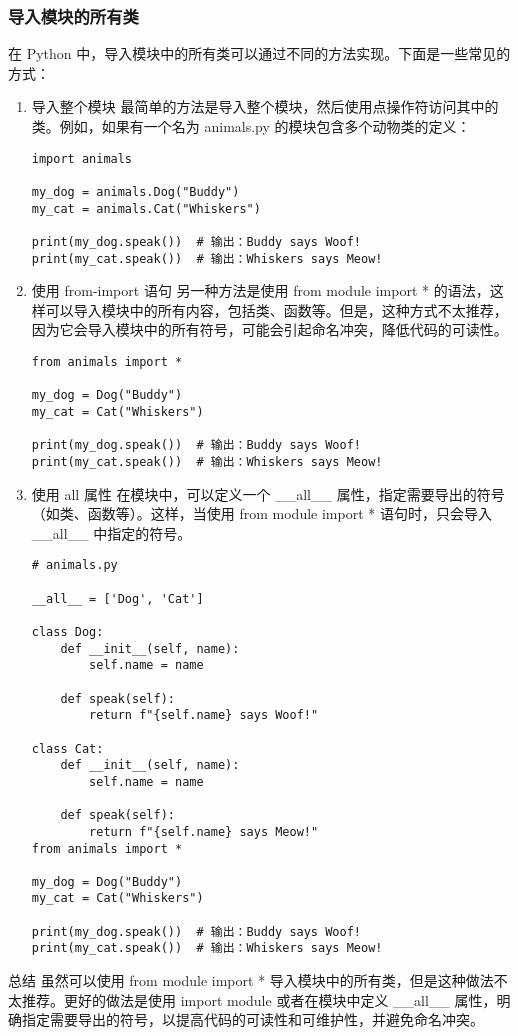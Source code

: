 \documentclass{article}
\begin{document}
\subsubsection{导入模块的所有类}
在 Python 中，导入模块中的所有类可以通过不同的方法实现。下面是一些常见的方式：
\begin{enumerate}
    

 
 \item 导入整个模块 最简单的方法是导入整个模块，然后使用点操作符访问其中的类。例如，如果有一个名为 animals.py 的模块包含多个动物类的定义：
\begin{lstlisting}[caption={示例Python代码}]
import animals

my_dog = animals.Dog("Buddy")
my_cat = animals.Cat("Whiskers")

print(my_dog.speak())  # 输出：Buddy says Woof!
print(my_cat.speak())  # 输出：Whiskers says Meow!
\end{lstlisting}
\item 使用 from-import 语句
另一种方法是使用 from module import * 的语法，这样可以导入模块中的所有内容，包括类、函数等。但是，这种方式不太推荐，因为它会导入模块中的所有符号，可能会引起命名冲突，降低代码的可读性。
\begin{lstlisting}[caption={示例Python代码}]
from animals import *

my_dog = Dog("Buddy")
my_cat = Cat("Whiskers")

print(my_dog.speak())  # 输出：Buddy says Woof!
print(my_cat.speak())  # 输出：Whiskers says Meow!
\end{lstlisting}
\item 使用 all 属性
在模块中，可以定义一个 \_\_all\_\_ 属性，指定需要导出的符号（如类、函数等）。这样，当使用 from module import * 语句时，只会导入 \_\_all\_\_ 中指定的符号。
\begin{lstlisting}[caption={示例Python代码}]
# animals.py

__all__ = ['Dog', 'Cat']

class Dog:
    def __init__(self, name):
        self.name = name

    def speak(self):
        return f"{self.name} says Woof!"

class Cat:
    def __init__(self, name):
        self.name = name

    def speak(self):
        return f"{self.name} says Meow!"
from animals import *

my_dog = Dog("Buddy")
my_cat = Cat("Whiskers")

print(my_dog.speak())  # 输出：Buddy says Woof!
print(my_cat.speak())  # 输出：Whiskers says Meow!
\end{lstlisting}
\end{enumerate}
总结
虽然可以使用 from module import * 导入模块中的所有类，但是这种做法不太推荐。更好的做法是使用 import module 或者在模块中定义 \_\_all\_\_ 属性，明确指定需要导出的符号，以提高代码的可读性和可维护性，并避免命名冲突。
\end{document}
